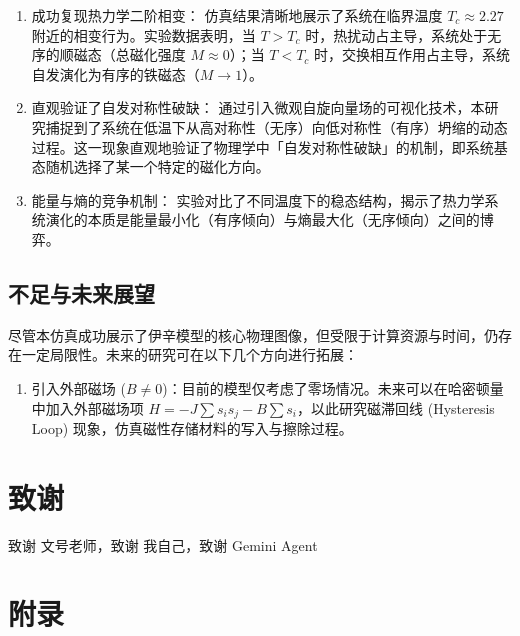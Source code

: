 \documentclass[supercite]{Experimental_Report}
\theoremstyle{definition}
\begin{document}
	\begin{enumerate}\item 成功复现热力学二阶相变： 仿真结果清晰地展示了系统在临界温度 $T_c \approx 2.27$ 附近的相变行为。实验数据表明，当 $T > T_c$ 时，热扰动占主导，系统处于无序的顺磁态（总磁化强度 $M \approx 0$）；当 $T < T_c$ 时，交换相互作用占主导，系统自发演化为有序的铁磁态（$M \to 1$）。\item 直观验证了自发对称性破缺： 通过引入微观自旋向量场的可视化技术，本研究捕捉到了系统在低温下从高对称性（无序）向低对称性（有序）坍缩的动态过程。这一现象直观地验证了物理学中「自发对称性破缺」的机制，即系统基态随机选择了某一个特定的磁化方向。\item 能量与熵的竞争机制： 实验对比了不同温度下的稳态结构，揭示了热力学系统演化的本质是能量最小化（有序倾向）与熵最大化（无序倾向）之间的博弈。
	\end{enumerate}
	
	\subsection{不足与未来展望}
	尽管本仿真成功展示了伊辛模型的核心物理图像，但受限于计算资源与时间，仍存在一定局限性。未来的研究可在以下几个方向进行拓展：
	
	\begin{enumerate}\item 
		引入外部磁场 ($B \neq 0$)：目前的模型仅考虑了零场情况。未来可以在哈密顿量中加入外部磁场项 $H = -J \sum s_i s_j - B \sum s_i$，以此研究磁滞回线 (Hysteresis Loop) 现象，仿真磁性存储材料的写入与擦除过程。
	\end{enumerate}
	
	\section{致谢}
	致谢 文号老师，致谢 我自己，致谢 Gemini Agent
	\section{附录}
\end{document}
